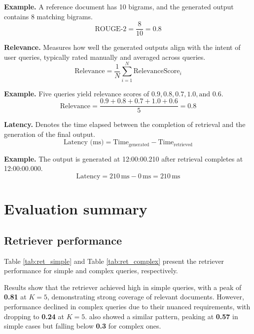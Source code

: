 	\textbf{Example.} A reference document has 10 bigrams, and the generated output contains 8 matching bigrams.
	\begin{equation*}
		\text{ROUGE-2} = \frac{8}{10} = 0.8
	\end{equation*}
	
	\noindent\textbf{Relevance.} Measures how well the generated outputs align with the intent of user queries, typically rated manually and averaged across queries.
	\[
	\text{Relevance} = \frac{1}{N} \sum_{i=1}^{N} \text{RelevanceScore}_i
	\]
	
	\textbf{Example.} Five queries yield relevance scores of \( 0.9, 0.8, 0.7, 1.0, \text{and } 0.6 \).
	\begin{equation*}
		\text{Relevance} = \frac{0.9 + 0.8 + 0.7 + 1.0 + 0.6}{5} = 0.8
	\end{equation*}
	
	\noindent\textbf{Latency.} Denotes the time elapsed between the completion of retrieval and the generation of the final output.
	\[
	\text{Latency (ms)} = \text{Time}_{\text{generated}} - \text{Time}_{\text{retrieved}}
	\]
	
	\textbf{Example.} The output is generated at 12:00:00.210 after retrieval completes at 12:00:00.000.
	\begin{equation*}
		\text{Latency} = 210\,\text{ms} - 0\,\text{ms} = 210\,\text{ms}
	\end{equation*}


\section{Evaluation summary}

\subsection*{Retriever performance}

Table \ref{tab:ret_simple} and Table \ref{tab:ret_complex} present the retriever performance for simple and complex queries, respectively.

Results show that the retriever achieved high  in simple queries, with a peak of \textbf{0.81} at \( K = 5 \), demonstrating strong coverage of relevant documents. However, performance declined in complex queries due to their nuanced requirements, with  dropping to \textbf{0.24} at \( K = 5 \).  also showed a similar pattern, peaking at \textbf{0.57} in simple cases but falling below \textbf{0.3} for complex ones.

